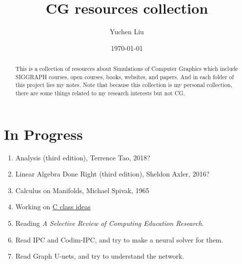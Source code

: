 \documentclass{article}
\title{CG resources collection}
\author{Yuchen Liu}
\date{\today}
\begin{document}
\setcounter{section}{-1}
\maketitle
\tableofcontents

\begin{abstract}
    This is a collection of resources about Simulations of Computer Graphics which include SIGGRAPH courses, open courses, books, websites, and papers. And in each folder of this project lies my notes. Note that because this collection is my personal collection, there are some things related to my research interests but not CG.
\end{abstract}

\section{In Progress}
\begin{enumerate}
    \item Analysis (third edition), Terrence Tao, 2018?
    \item Linear Algebra Done Right (third edition), Sheldon Axler, 2016?
    \item Calculus on Manifolds, Michael Spivak, 1965
    \item Working on \href{https://hlxy-420.github.io/c-class-ideas}{C class ideas}
    \item Reading \textit{A Selective Review of Computing Education Research}.
    \item Read IPC and Codim-IPC, and try to make a neural solver for them.
    \item Read Graph U-nets, and try to understand the network.
\end{enumerate}

\newpage
\end{document}
